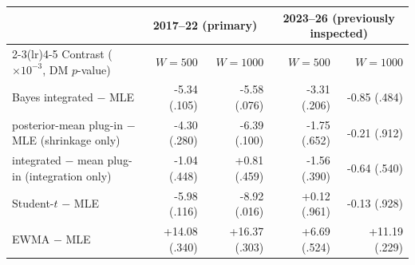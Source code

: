 \begin{tabular}{lrrrr}\toprule
 & \multicolumn{2}{c}{2017--22 (primary)} & \multicolumn{2}{c}{2023--26 (previously inspected)}\\\cmidrule(lr){2-3}\cmidrule(lr){4-5}
Contrast ($\times10^{-3}$, DM $p$-value) & $W{=}500$ & $W{=}1000$ & $W{=}500$ & $W{=}1000$\\\midrule
Bayes integrated $-$ MLE & -5.34 (.105) & -5.58 (.076) & -3.31 (.206) & -0.85 (.484) \\
posterior-mean plug-in $-$ MLE (shrinkage only) & -4.30 (.280) & -6.39 (.100) & -1.75 (.652) & -0.21 (.912) \\
integrated $-$ mean plug-in (integration only) & -1.04 (.448) & +0.81 (.459) & -1.56 (.390) & -0.64 (.540) \\
Student-$t$ $-$ MLE & -5.98 (.116) & -8.92 (.016) & +0.12 (.961) & -0.13 (.928) \\
EWMA $-$ MLE & +14.08 (.340) & +16.37 (.303) & +6.69 (.524) & +11.19 (.229) \\
\bottomrule\end{tabular}
